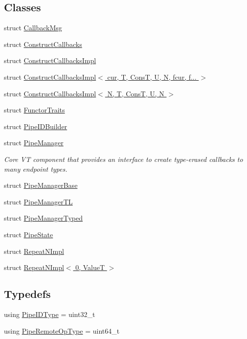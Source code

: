 \subsection*{Classes}
\begin{DoxyCompactItemize}
\item 
struct \hyperlink{structvt_1_1pipe_1_1_callback_msg}{Callback\+Msg}
\item 
struct \hyperlink{structvt_1_1pipe_1_1_construct_callbacks}{Construct\+Callbacks}
\item 
struct \hyperlink{structvt_1_1pipe_1_1_construct_callbacks_impl}{Construct\+Callbacks\+Impl}
\item 
struct \hyperlink{structvt_1_1pipe_1_1_construct_callbacks_impl_3_01cur_00_01_t_00_01_cons_t_00_01_u_00_01_n_00_01fcur_00_01f_8_8_8_01_4}{Construct\+Callbacks\+Impl$<$ cur, T, Cons\+T, U, N, fcur, f... $>$}
\item 
struct \hyperlink{structvt_1_1pipe_1_1_construct_callbacks_impl_3_01_n_00_01_t_00_01_cons_t_00_01_u_00_01_n_01_4}{Construct\+Callbacks\+Impl$<$ N, T, Cons\+T, U, N $>$}
\item 
struct \hyperlink{structvt_1_1pipe_1_1_functor_traits}{Functor\+Traits}
\item 
struct \hyperlink{structvt_1_1pipe_1_1_pipe_i_d_builder}{Pipe\+I\+D\+Builder}
\item 
struct \hyperlink{structvt_1_1pipe_1_1_pipe_manager}{Pipe\+Manager}
\begin{DoxyCompactList}\small\item\em Core VT component that provides an interface to create type-\/erased callbacks to many endpoint types. \end{DoxyCompactList}\item 
struct \hyperlink{structvt_1_1pipe_1_1_pipe_manager_base}{Pipe\+Manager\+Base}
\item 
struct \hyperlink{structvt_1_1pipe_1_1_pipe_manager_t_l}{Pipe\+Manager\+TL}
\item 
struct \hyperlink{structvt_1_1pipe_1_1_pipe_manager_typed}{Pipe\+Manager\+Typed}
\item 
struct \hyperlink{structvt_1_1pipe_1_1_pipe_state}{Pipe\+State}
\item 
struct \hyperlink{structvt_1_1pipe_1_1_repeat_n_impl}{Repeat\+N\+Impl}
\item 
struct \hyperlink{structvt_1_1pipe_1_1_repeat_n_impl_3_010_00_01_value_t_01_4}{Repeat\+N\+Impl$<$ 0, Value\+T $>$}
\end{DoxyCompactItemize}
\subsection*{Typedefs}
\begin{DoxyCompactItemize}
\item 
using \hyperlink{namespacevt_1_1pipe_a8aa7908de242917ac0922b9e9c85fea4}{Pipe\+I\+D\+Type} = uint32\+\_\+t
\item 
using \hyperlink{namespacevt_1_1pipe_a9f156f00d06693969d89a230a38eab52}{Pipe\+Remote\+Op\+Type} = uint64\+\_\+t
\end{DoxyCompactItemize}
